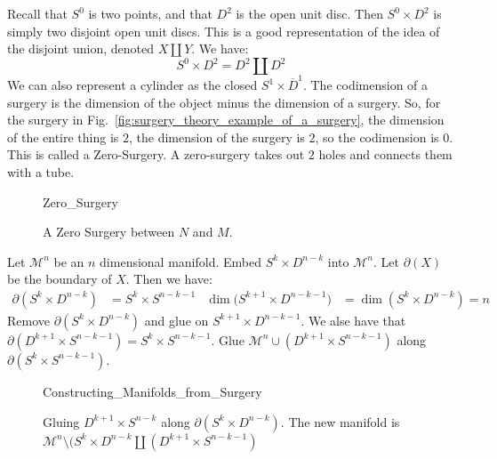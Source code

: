 \documentclass[crop=false,class=article,oneside]{standalone}
\begin{document}
            Recall that $S^{0}$ is two points, and that
            $D^{2}$ is the open unit disc. Then $S^{0}\times D^{2}$
            is simply two disjoint open unit discs. This is a good
            representation of the idea of the disjoint union,
            denoted $X\coprod Y$. We have:
            \begin{equation*}
                S^{0}\times{D^{2}}=D^{2}\coprod{D^{2}}
            \end{equation*}
            We can also represent a cylinder as the closed
            $S^{1}\times \overline{D}^{1}$. The codimension
            of a surgery is the dimension of the object minus
            the dimension of a surgery. So, for the surgery
            in Fig.~\ref{fig:surgery_theory_example_of_a_surgery},
            the dimension of the entire thing is $2$, the dimension
            of the surgery is $2$, so the codimension is $0$.
            This is called a Zero-Surgery. A zero-surgery takes
            out $2$ holes and connects them with a tube.
            \begin{figure}[H]
                \centering
                \captionsetup{type=figure}
                {Zero_Surgery}
                \caption[Surgery Theory - A Zero Surgery]{A Zero Surgery between $N$ and $M$.}
                \label{fig:surgery_theory_a_zero_surgery}
            \end{figure}
            Let $\mathcal{M}^{n}$ be an $n$ dimensional manifold.
            Embed
            $S^{k}\times D^{n-k}$ into $\mathcal{M}^{n}$.
            Let $\partial(X)$ be the boundary of $X$.
            Then we have:
            \begin{align*}
                \partial(S^{k}\times {D^{n-k}})
                &=S^{k}\times{S^{n-k-1}}
                &
                \dim(S^{k+1}\times{D^{n-k-1})}
                &=\dim(S^{k}\times{D^{n-k}})=n
            \end{align*}
            Remove $\partial(S^{k}\times{D^{n-k}})$ and
            glue on $S^{k+1}\times{D}^{n-k-1}$.
            We alse have that
            $\partial(D^{k+1}\times{S^{n-k-1}})%
             =S^{k}\times{S^{n-k-1}}$.
            Glue $\mathcal{M}^{n}\cup(D^{k+1}\times S^{n-k-1})$
            along $\partial(S^{k}\times{S^{n-k-1}})$.
            \begin{figure}[H]
                \centering
                \captionsetup{type=figure}
                
                          {Constructing_Manifolds_from_Surgery}
                \caption[Surgery Theory - Surgery Example]{%
                    Gluing $D^{k+1}\times S^{n-k}$ along
                    $\partial(S^{k}\times D^{n-k})$.
                    The new manifold is
                    $\mathcal{M}^{n}\setminus
                     (S^{k}\times D^{n-k}\coprod
                     (D^{k+1}\times S^{n-k-1})$
                }
                \label{fig:surgery_theory_glueing_S_k_D_n_k_to_M}
            \end{figure}
\end{document}
